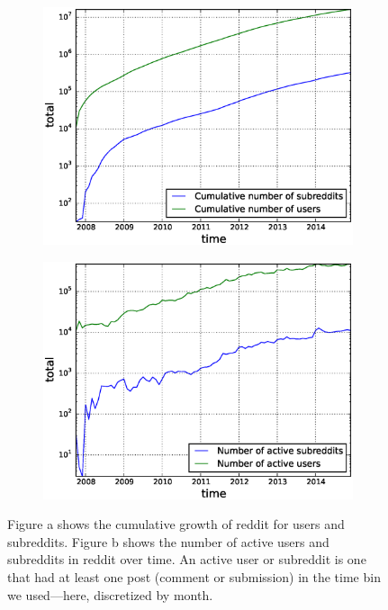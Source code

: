 \begin{figure}[!tb]
\centering
\begin{subfigure}{.49\textwidth}\includegraphics[scale=0.4]{./images/cumulative_users_subreddits.eps}\caption{}\end{subfigure}
\begin{subfigure}{.49\textwidth}\includegraphics[scale=0.4]{./images/active_users_subreddits.eps}\caption{}\end{subfigure}
\caption{Figure a shows the cumulative growth of reddit for users and subreddits. Figure b shows the number of active users and subreddits in reddit over time. An active user or subreddit is one that had at least one post (comment or submission) in the time bin we used---here, discretized by month.}
\label{fig:cumulative}
\end{figure}

